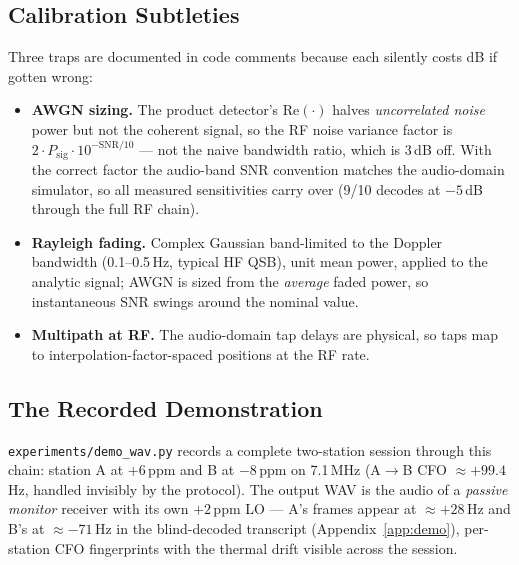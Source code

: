 \subsection{Calibration Subtleties}

Three traps are documented in code comments because each silently
costs dB if gotten wrong:

\begin{itemize}
    \item \textbf{AWGN sizing.}  The product detector's
          $\mathrm{Re}(\cdot)$ halves \emph{uncorrelated noise} power
          but not the coherent signal, so the RF noise variance factor
          is $2 \cdot P_{\mathrm{sig}} \cdot 10^{-\mathrm{SNR}/10}$
          --- not the naive bandwidth ratio, which is 3\,dB off.  With
          the correct factor the audio-band SNR convention matches the
          audio-domain simulator, so all measured sensitivities carry
          over (9/10 decodes at $-5$\,dB through the full RF chain).
    \item \textbf{Rayleigh fading.}  Complex Gaussian band-limited to
          the Doppler bandwidth (0.1--0.5\,Hz, typical HF QSB), unit
          mean power, applied to the analytic signal; AWGN is sized
          from the \emph{average} faded power, so instantaneous SNR
          swings around the nominal value.
    \item \textbf{Multipath at RF.}  The audio-domain tap delays are
          physical, so taps map to interpolation-factor-spaced
          positions at the RF rate.
\end{itemize}

\subsection{The Recorded Demonstration}

\texttt{experiments/demo\_wav.py} records a complete two-station
session through this chain: station A at $+6$\,ppm and B at $-8$\,ppm
on 7.1\,MHz (A$\rightarrow$B CFO $\approx +99.4$\,Hz, handled
invisibly by the protocol).  The output WAV is the audio of a
\emph{passive monitor} receiver with its own $+2$\,ppm LO --- A's
frames appear at $\approx +28$\,Hz and B's at $\approx -71$\,Hz in the
blind-decoded transcript (Appendix~\ref{app:demo}), per-station CFO
fingerprints with the thermal drift visible across the session.
